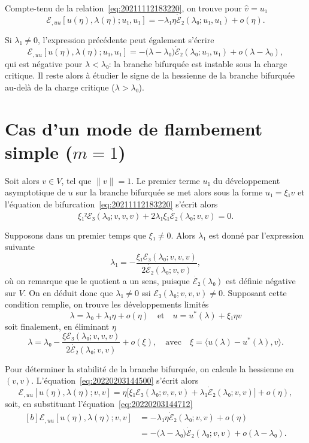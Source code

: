 \documentclass[12pt, final]{amsart}
\begin{document}
Compte-tenu de la relation~\eqref{eq:20211112183220}, on trouve pour
\(\hat{v}=u₁\)
\begin{equation}
  ℰ_{,uu}[u(η), λ(η); u₁, u₁]=-λ₁η\dot{ℰ}₂(λ₀; u₁, u₁)+o(η).
\end{equation}

Si \(λ₁≠0\), l'expression précédente peut également s'écrire
\begin{equation}
  ℰ_{,uu}[u(η), λ(η); u₁, u₁]=-\bigl(λ-λ₀\bigr)\dot{ℰ}₂(λ₀; u₁, u₁)+o(λ-λ₀),
\end{equation}
qui est négative pour \(λ<λ₀\): la branche bifurquée est instable sous la
charge critique. Il reste alors à étudier le signe de la hessienne de la
branche bifurquée au-delà de la charge critique (\(λ>λ₀\)).

\section{Cas d'un mode de flambement simple (\(m=1\))}

Soit alors \(v∈V\), tel que \(\lVert v\rVert=1\). Le premier terme \(u₁\) du
développement asymptotique de \(u\) sur la branche bifurquée se met alors sous
la forme \(u₁=ξ₁v\) et l'équation de bifurcation~\eqref{eq:20211112183220}
s'écrit alors
\begin{equation}
  \label{eq:20220203144712}
  ξ₁² ℰ₃(λ₀;v, v, v)+2λ₁ξ₁\dot{ℰ₂}(λ₀;v, v)=0.
\end{equation}

Supposons dans un premier temps que \(ξ₁≠0\). Alors \(λ₁\) est donné par
l'expression suivante
\begin{equation}
  λ₁=-\frac{ξ₁ℰ₃(λ₀;v, v, v)}{2\dot{ℰ₂}(λ₀;v, v)},
\end{equation}
où on remarque que le quotient a un sens, puisque \(\dot{ℰ₂}(λ₀)\) est définie
négative sur \(V\). On en déduit donc que \(λ₁≠0\) ssi \(ℰ₃(λ₀;v, v,
v)≠0\). Supposant cette condition remplie, on trouve les développements limités
\begin{equation}
  λ=λ₀+λ₁η+o(η)
  \quad\text{et}\quad
  u=u^*(λ)+ξ₁ηv
\end{equation}
soit finalement, en éliminant \(η\)
\begin{equation}
  λ=λ₀-\frac{ξℰ₃(λ₀;v, v, v)}{2\dot{ℰ₂}(λ₀;v, v)}+o(ξ),
  \quad\text{avec}\quad
  ξ=〈u(λ)-u^*(λ), v〉.
\end{equation}

Pour déterminer la stabilité de la branche bifurquée, on calcule la hessienne
en \((v, v)\). L'équation~\eqref{eq:20220203144500} s'écrit alors
\begin{equation}
  ℰ_{,uu}[u(η), λ(η); v, v]
  =η\bigl[ξ₁ℰ₃(λ₀; v, v, v)+λ₁\dot{ℰ}₂(λ₀; v, v)\bigr]+o(η),
\end{equation}
soit, en substituant l'équation~\eqref{eq:20220203144712}
\begin{equation}
  \begin{aligned}[b]
    ℰ_{,uu}[u(η), λ(η); v, v]
    &=-λ₁η\dot{ℰ}₂(λ₀; v, v)+o(η)\\
    &=-\bigl(λ-λ₀\bigr)\dot{ℰ}₂(λ₀; v, v)+o(λ-λ₀).
  \end{aligned}
\end{equation}
\end{document}
